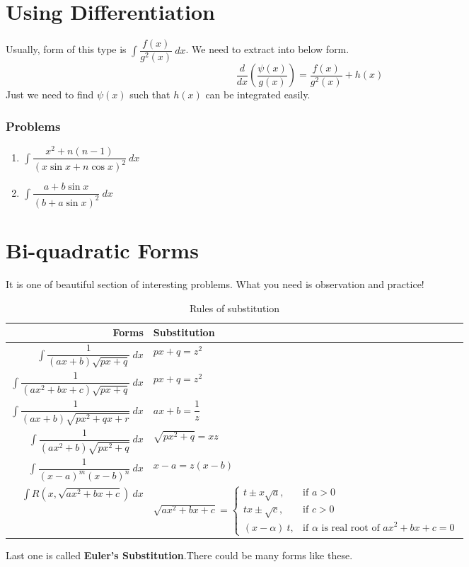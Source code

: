 \documentclass[12pt,a4paper,twoside]{book}
\newcommand{\dint}[1]{\displaystyle{\int #1 \  dx}}
\begin{document}
\section{Using Differentiation}
Usually, form of this type is $\dint{\dfrac{f(x)}{g^2(x)}}$. We need to extract into below form. $${\dfrac{d}{dx}\left(\dfrac{\psi(x)}{g(x)}\right)}=\dfrac{f(x)}{g^2(x)}+h(x)$$Just we need to find $\psi(x)$ such that $h(x)$ can be integrated easily.
\subsubsection{Problems}
\begin{multicols}{2}
	\begin{enumerate}
	\item $\dint{\dfrac{x^2+n(n-1)}{(x\sin x+ n\cos x)^2}}$
	\item $\dint{\dfrac{a+b\sin x}{(b+a\sin x)^2}}$
	\end{enumerate}
	\end{multicols}
\section{Bi-quadratic Forms}
It is one of beautiful section of interesting problems. What you need is observation and practice!

\begin{table}[H]
\def\arraystretch{2.5}
\setlength{\arrayrulewidth}{0.5mm}
\centering
\caption{Rules of substitution}
\vspace{10pt}
\begin{tabular}{rl}
\hline
\textbf{Forms} & \textbf{Substitution} \\ \hline
$\dint{\dfrac{1}{(ax+b)\sqrt{px+q}}}$ & $px+q=z^2$ \\ 
$\dint{\dfrac{1}{(ax^2+bx+c)\sqrt{px+q}}}$ & $px+q=z^2$ \\
$\dint{\dfrac{1}{(ax+b)\sqrt{px^2+qx+r}}}$ & $ax+b=\dfrac{1}{z}$ \\ 
$\dint{\dfrac{1}{(ax^2+b)\sqrt{px^2+q}}}$ & $\sqrt{px^2+q}=xz$ \\ 
$\dint{\dfrac{1}{(x-a)^m (x-b)^n}}$ & $x-a=z(x-b) $ \\
$\dint{R(x,\sqrt{ax^2+bx+c})}$ & $ 
\sqrt{ax^2+bx+c}= 
\begin{cases}
t \pm x\sqrt{a}, & \text{if }a>0 \\
tx \pm \sqrt{c}, & \text{if }c>0 \\
(x-\alpha)\ t,     & \text{if }\alpha\text{ is real root of }ax^2+bx+c=0
\end{cases}

$
\\ [10pt]
\hline
\end{tabular}
\end{table}
Last one is called \textbf{Euler's Substitution}.There could be many forms like these.
\end{document}
